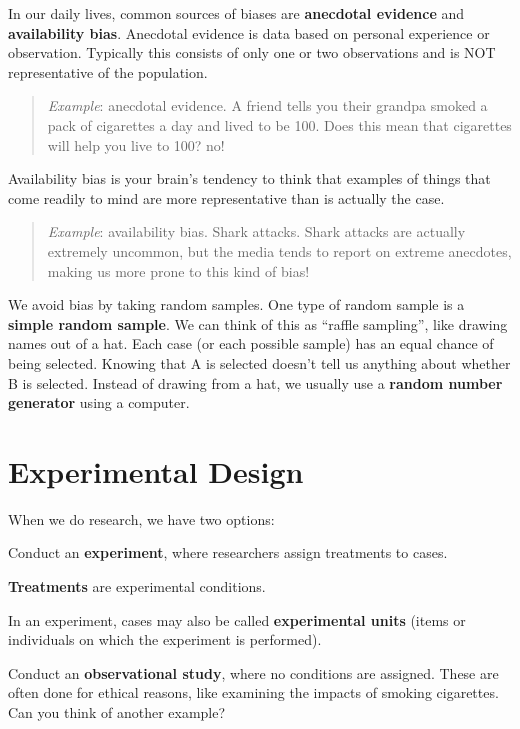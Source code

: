 \documentclass[
]{book}
\begin{document}
In our daily lives, common sources of biases are \textbf{anecdotal evidence} and \textbf{availability bias}. Anecdotal evidence is data based on personal experience or observation. Typically this consists of only one or two observations and is NOT representative of the population.

\begin{quote}
\emph{Example}: anecdotal evidence. A friend tells you their grandpa smoked a pack of cigarettes a day and lived to be 100. Does this mean that cigarettes will help you live to 100? no!
\end{quote}

Availability bias is your brain's tendency to think that examples of things that come readily to mind are more representative than is actually the case.

\begin{quote}
\emph{Example}: availability bias. Shark attacks. Shark attacks are actually extremely uncommon, but the media tends to report on extreme anecdotes, making us more prone to this kind of bias!
\end{quote}

We avoid bias by taking random samples. One type of random sample is a \textbf{simple random sample}. We can think of this as ``raffle sampling'', like drawing names out of a hat. Each case (or each possible sample) has an equal chance of being selected. Knowing that A is selected doesn't tell us anything about whether B is selected. Instead of drawing from a hat, we usually use a \textbf{random number generator} using a computer.

\hypertarget{experimental-design}{%
\section{Experimental Design}\label{experimental-design}}

When we do research, we have two options:

Conduct an \textbf{experiment}, where researchers assign treatments to cases.

\textbf{Treatments} are experimental conditions.

In an experiment, cases may also be called \textbf{experimental units} (items or individuals on which the experiment is performed).

Conduct an \textbf{observational study}, where no conditions are assigned. These are often done for ethical reasons, like examining the impacts of smoking cigarettes. Can you think of another example?
\end{document}
